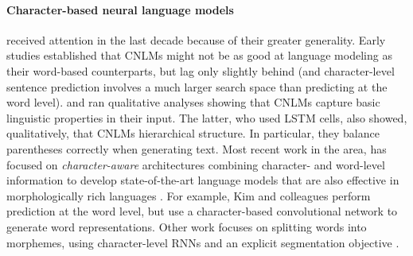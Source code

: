 \paragraph{Character-based neural language models} received attention in the last
decade because of their greater generality. %
Early studies
\cite{Mikolov:etal:2011,Sutskever:etal:2011,DBLP:journals/corr/Graves13}
established that CNLMs might not be as good at language modeling as
their word-based counterparts, but lag only slightly behind (and
character-level sentence prediction involves a much larger search
space than predicting at the word
level).  and
 ran qualitative analyses showing
that CNLMs capture basic linguistic properties in their input. The
latter, who used LSTM cells, also showed, qualitatively, that CNLMs
hierarchical structure. In particular, they balance parentheses
correctly when generating text. %
Most recent work in the area, has focused on \emph{character-aware}
architectures combining character- and word-level information to
develop state-of-the-art language models that are also effective in
morphologically rich languages
\citep[e.g.,][]{Bojanowski:etal:2016,Kim:etal:2016,Gerz:etal:2018}. For
example, Kim and colleagues perform
prediction at the word level, but use a character-based convolutional
network to generate word representations. Other work focuses on
splitting words into morphemes, using character-level RNNs and an
explicit segmentation objective \cite[e.g.,][]{Kann:etal:2016}.


